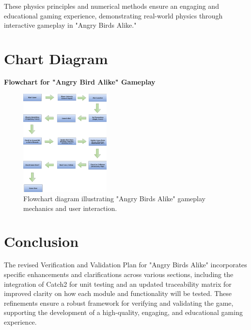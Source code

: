 \documentclass[12pt]{article}
\begin{document}
These physics principles and numerical methods ensure an engaging and educational gaming experience, demonstrating real-world physics through interactive gameplay in "Angry Birds Alike."

\section{Chart Diagram}
\textbf{Flowchart for "Angry Bird Alike" Gameplay}

\begin{figure}[!hb]
    \centering
    \includegraphics[width=0.5\linewidth]{Flowchartvnv.png}
    \caption{Flowchart diagram illustrating "Angry Birds Alike" gameplay mechanics and user interaction.}
    \label{fig:flowchart}
\end{figure}

\section{Conclusion}
The revised Verification and Validation Plan for "Angry Birds Alike" incorporates specific enhancements and clarifications across various sections, including the integration of Catch2 for unit testing and an updated traceability matrix for improved clarity on how each module and functionality will be tested. These refinements ensure a robust framework for verifying and validating the game, supporting the development of a high-quality, engaging, and educational gaming experience.
\end{document}
